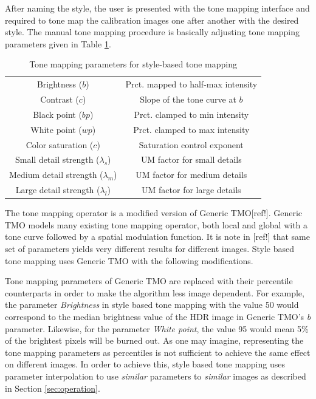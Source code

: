 After naming the style, the user is presented with the tone mapping interface and required to tone map the calibration images one after another with the desired style. The manual tone mapping procedure is basically adjusting tone mapping parameters given in Table \ref{tab:tonemap_parameters}.

\begin{table}[h!]
\caption{Tone mapping parameters for style-based tone mapping}
\label{tab:tonemap_parameters}
\centering
\begin{tabular}{|c|c|}
\hline 
Brightness ($b$) & Prct. mapped to half-max intensity \\
Contrast ($c$) & Slope of the tone curve at $b$ \\
Black point ($bp$) & Prct. clamped to min intensity \\
White point ($wp$) & Prct. clamped to max intensity \\
Color saturation ($c$) & Saturation control exponent \\
\hline
Small detail strength ($\lambda_s$) & UM factor for small details \\
Medium detail strength ($\lambda_m$) & UM factor for medium details \\
Large detail strength ($\lambda_l$) & UM factor for large details \\
\hline
\end{tabular}
\end{table}

The tone mapping operator is a modified version of Generic TMO[ref!]. Generic TMO models many existing tone mapping operator, both local and global with a tone curve followed by a spatial modulation function. It is note in [ref!] that same set of parameters yields very different results for different images. Style based tone mapping uses Generic TMO with the following modifications.

Tone mapping parameters of Generic TMO are replaced with their percentile counterparts in order to make the algorithm less image dependent. For example, the parameter \emph{Brightness} in style based tone mapping with the value 50 would correspond to the median brightness value of the HDR image in Generic TMO's \emph{b} parameter. Likewise, for the parameter \emph{White point}, the value 95 would mean 5\% of the brightest pixels will be burned out. As one may imagine, representing the tone mapping parameters as percentiles is not sufficient to achieve the same effect on different images. In order to achieve this, style based tone mapping uses parameter interpolation to use \emph{similar} parameters to \emph{similar} images as described in Section \ref{sec:operation}. 

